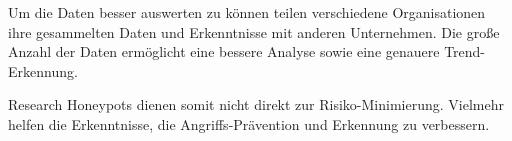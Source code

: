 Um die Daten besser auswerten zu können teilen verschiedene Organisationen ihre gesammelten Daten und Erkenntnisse mit anderen Unternehmen. Die große Anzahl der Daten ermöglicht eine bessere Analyse sowie eine genauere Trend-Erkennung. 

Research Honeypots dienen somit nicht direkt zur Risiko-Minimierung. Vielmehr helfen die Erkenntnisse, die Angriffs-Prävention und Erkennung zu verbessern.